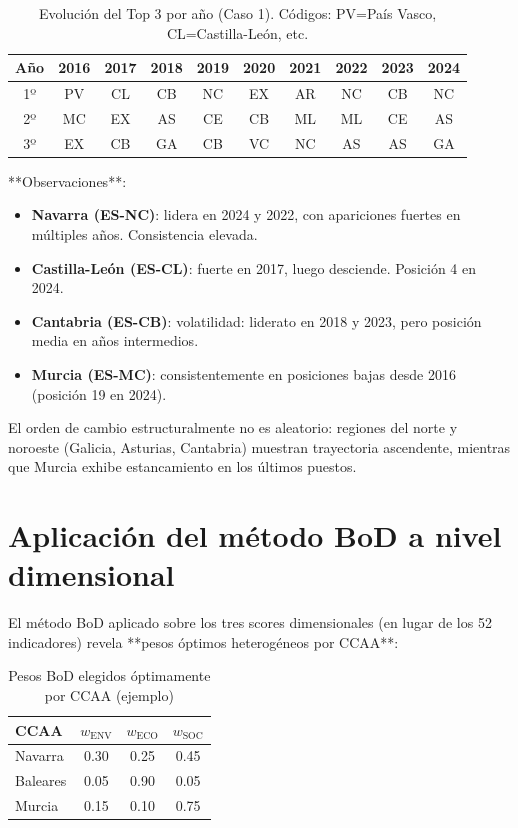 {\begin{table}[H]
    \centering
    \small
    \begin{tabular}{cccccccccc}
        \toprule
        \textbf{Año} & \textbf{2016} & \textbf{2017} & \textbf{2018} & \textbf{2019} & \textbf{2020} & \textbf{2021} & \textbf{2022} & \textbf{2023} & \textbf{2024} \\
        \midrule
        1º & PV & CL & CB & NC & EX & AR & NC & CB & NC \\
        2º & MC & EX & AS & CE & CB & ML & ML & CE & AS \\
        3º & EX & CB & GA & CB & VC & NC & AS & AS & GA \\
        \bottomrule
    \end{tabular}
    \caption{Evolución del Top 3 por año (Caso 1). Códigos: PV=País Vasco, CL=Castilla-León, etc.}
    \label{tab:evol_top3}
\end{table}

**Observaciones**:
\begin{itemize}
    \item \textbf{Navarra (ES-NC)}: lidera en 2024 y 2022, con apariciones fuertes en múltiples años. Consistencia elevada.
    \item \textbf{Castilla-León (ES-CL)}: fuerte en 2017, luego desciende. Posición 4 en 2024.
    \item \textbf{Cantabria (ES-CB)}: volatilidad: liderato en 2018 y 2023, pero posición media en años intermedios.
    \item \textbf{Murcia (ES-MC)}: consistentemente en posiciones bajas desde 2016 (posición 19 en 2024).
\end{itemize}

El orden de cambio estructuralmente no es aleatorio: regiones del norte y noroeste (Galicia, Asturias, Cantabria) muestran trayectoria ascendente, mientras que Murcia exhibe estancamiento en los últimos puestos.

\section{Aplicación del método BoD a nivel dimensional}

El método BoD aplicado sobre los tres scores dimensionales (en lugar de los 52 indicadores) revela **pesos óptimos heterogéneos por CCAA**:

\begin{table}[H]
    \centering
    \small
    \begin{tabular}{lccc}
        \toprule
        \textbf{CCAA} & \textbf{$w_{\text{ENV}}$} & \textbf{$w_{\text{ECO}}$} & \textbf{$w_{\text{SOC}}$} \\
        \midrule
        Navarra & 0.30 & 0.25 & 0.45 \\
        Baleares & 0.05 & 0.90 & 0.05 \\
        Murcia & 0.15 & 0.10 & 0.75 \\
        \bottomrule
    \end{tabular}
    \caption{Pesos BoD elegidos óptimamente por CCAA (ejemplo)}
    \label{tab:pesos_bod_ccaa}
\end{table}

}
